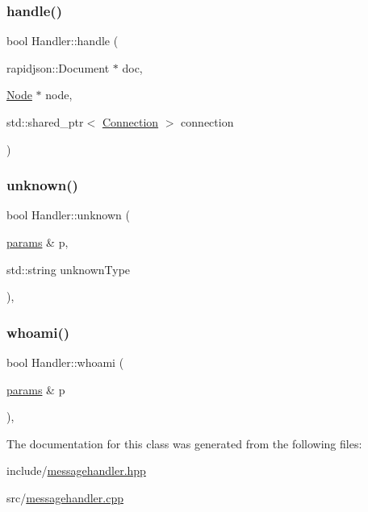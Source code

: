 \subsubsection{\texorpdfstring{handle()}{handle()}}
{\footnotesize\ttfamily bool Handler\+::handle (\begin{DoxyParamCaption}\item[{rapidjson\+::\+Document $\ast$}]{doc,  }\item[{\mbox{\hyperlink{classNode}{Node}} $\ast$}]{node,  }\item[{std\+::shared\+\_\+ptr$<$ \mbox{\hyperlink{classConnection}{Connection}} $>$}]{connection }\end{DoxyParamCaption})\hspace{0.3cm}{\ttfamily [static]}}

\mbox{\label{classHandler_aff9b9d060534a0a09a63a4d7c1b65407}} 
\subsubsection{\texorpdfstring{unknown()}{unknown()}}
{\footnotesize\ttfamily bool Handler\+::unknown (\begin{DoxyParamCaption}\item[{\mbox{\hyperlink{structHandler_1_1params}{params}} \&}]{p,  }\item[{std\+::string}]{unknown\+Type }\end{DoxyParamCaption})\hspace{0.3cm}{\ttfamily [static]}, {\ttfamily [private]}}

\mbox{\label{classHandler_afe1ccc0e741e068b6d0c667fc421b820}} 
\subsubsection{\texorpdfstring{whoami()}{whoami()}}
{\footnotesize\ttfamily bool Handler\+::whoami (\begin{DoxyParamCaption}\item[{\mbox{\hyperlink{structHandler_1_1params}{params}} \&}]{p }\end{DoxyParamCaption})\hspace{0.3cm}{\ttfamily [static]}, {\ttfamily [private]}}



The documentation for this class was generated from the following files\+:\begin{DoxyCompactItemize}
\item 
include/\mbox{\hyperlink{messagehandler_8hpp}{messagehandler.\+hpp}}\item 
src/\mbox{\hyperlink{messagehandler_8cpp}{messagehandler.\+cpp}}\end{DoxyCompactItemize}
